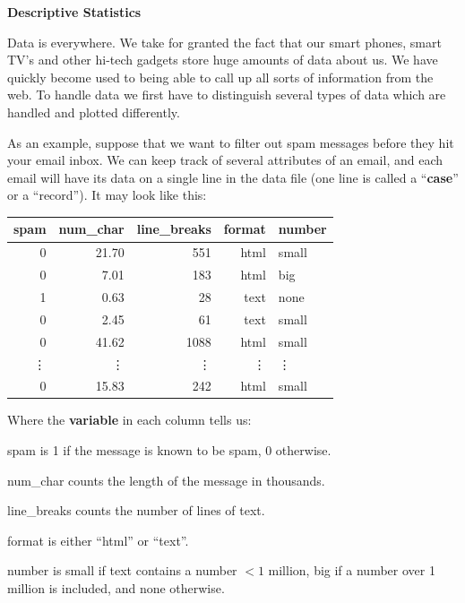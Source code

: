 \def\theTopic{Readings 1}


\begin{center}
{\bf {\large Descriptive Statistics}}
\end{center}


Data is everywhere.  We take for granted the fact that our smart
phones, smart TV's and other hi-tech gadgets store
huge amounts of data about us.  We have quickly become used to being
able to call up all sorts of information from the web. 
To handle data we first have to distinguish several types of data
which are handled and plotted differently.

As an example, suppose that we want to filter out spam messages before
they hit your email inbox.  We can keep track of several attributes
of an email, and each email will have its data on a single line in the
data file (one line is  called a ``{\bf case}'' or a  ``record''). It
may look like this:

\begin{table}[ht]
\centering
\begin{tabular}{rrrrl}
  \hline
 spam & num\_char & line\_breaks & format & number \\ 
  \hline
   0 & 21.70 & 551 &html& small \\ 
   0 & 7.01 & 183 &html& big \\ 
   1 & 0.63 &  28 &text& none \\ 
   0 & 2.45 &  61 &text& small \\ 
   0 & 41.62 & 1088 &html& small \\ 
 \vdots&\vdots&\vdots&\vdots&\vdots\\
   0 & 15.83 & 242 &html& small \\ 
   \hline
\end{tabular}
\end{table}

Where the {\bf variable} in each column tells us:\vspace{-.8cm}
\begin{list}{}{}
  \item [spam] is 1 if the message is known to be spam, 0 otherwise.
  \item [num\_char] counts the length of the message in thousands.
  \item [line\_breaks] counts the number of lines of text.
  \item [format] is either ``html'' or ``text''.
  \item [number] is small if text contains a number $< 1 $ million,
    big if a number over 1 million is included, and none otherwise. 
\end{list}

